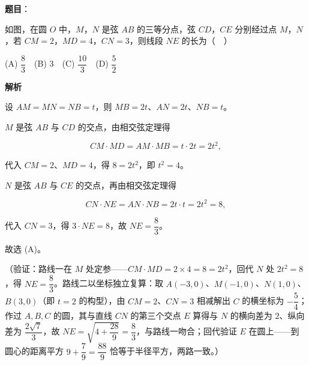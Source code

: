 \begin{answer}

\textbf{题目}：

如图，在圆 \(O\) 中，\(M\)，\(N\) 是弦 \(AB\) 的三等分点，弦 \(CD\)，\(CE\) 分别经过点 \(M\)，\(N\)，若 \(CM=2\)，\(MD=4\)，\(CN=3\)，则线段 \(NE\) 的长为（　）
\nopagebreak[4]
\begin{center}\end{center}
\nopagebreak[4]
(A) \(\dfrac{8}{3}\)　(B) 3　(C) \(\dfrac{10}{3}\)　(D) \(\dfrac{5}{2}\)

\textbf{解析}

设 \(AM=MN=NB=t\)，则 \(MB=2t\)、\(AN=2t\)、\(NB=t\)。

\(M\) 是弦 \(AB\) 与 \(CD\) 的交点，由相交弦定理得

\nopagebreak[4]
\[
CM\cdot MD=AM\cdot MB=t\cdot 2t=2t^2,
\]

代入 \(CM=2\)、\(MD=4\)，得 \(8=2t^2\)，即 \(t^2=4\)。

\(N\) 是弦 \(AB\) 与 \(CE\) 的交点，再由相交弦定理得

\nopagebreak[4]
\[
CN\cdot NE=AN\cdot NB=2t\cdot t=2t^2=8,
\]

代入 \(CN=3\)，得 \(3\cdot NE=8\)，故 \(NE=\dfrac{8}{3}\)。

故选 (A)。

（验证：路线一在 \(M\) 处定参——\(CM\cdot MD=2\times 4=8=2t^2\)，回代 \(N\) 处 \(2t^2=8\)，得 \(NE=\dfrac{8}{3}\)。路线二以坐标独立复算：取 \(A(-3,0)\)、\(M(-1,0)\)、\(N(1,0)\)、\(B(3,0)\)（即 \(t=2\) 的构型），由 \(CM=2\)、\(CN=3\) 相减解出 \(C\) 的横坐标为 \(-\dfrac{5}{4}\)；作过 \(A,B,C\) 的圆，其与直线 \(CN\) 的第三个交点 \(E\) 算得与 \(N\) 的横向差为 \(2\)、纵向差为 \(\dfrac{2\sqrt{7}}{3}\)，故 \(NE=\sqrt{4+\dfrac{28}{9}}=\dfrac{8}{3}\)，与路线一吻合；回代验证 \(E\) 在圆上——到圆心的距离平方 \(9+\dfrac{7}{9}=\dfrac{88}{9}\) 恰等于半径平方，两路一致。）


\end{answer}
